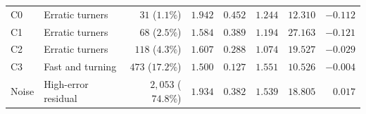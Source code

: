 \documentclass[12pt]{article}
\begin{document}
\begin{table}[H]
{\begin{tabular}{@{}llrrrrrr@{}}
    \addlinespace
    \multicolumn{8}{@{}l}{\textbf{Hard}} \\
    \midrule
    C0 & Erratic turners & $31$ ($1.1\%$) & $1.942$ & $0.452$ & $1.244$ & $12.310$ & $-0.112$ \\
    C1 & Erratic turners & $68$ ($2.5\%$) & $1.584$ & $0.389$ & $1.194$ & $27.163$ & $-0.121$ \\
    C2 & Erratic turners & $118$ ($4.3\%$) & $1.607$ & $0.288$ & $1.074$ & $19.527$ & $-0.029$ \\
    C3 & Fast and turning & $473$ ($17.2\%$) & $1.500$ & $0.127$ & $1.551$ & $10.526$ & $-0.004$ \\
    Noise & High-error residual & $2{,}053$ ($74.8\%$) & $1.934$ & $0.382$ & $1.539$ & $18.805$ & $0.017$ \\
    \bottomrule
  \end{tabular}
  }
\end{table}
\end{document}
